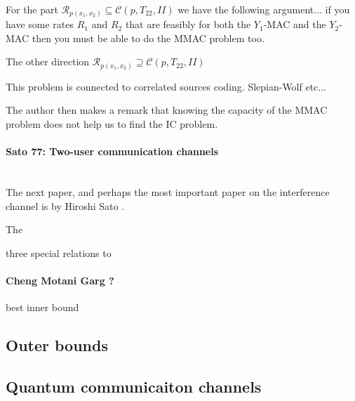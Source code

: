 \documentclass[aps,11pt,twoside,letterpaper]{article}
\begin{document}
         \\
        For the part $\mathcal{R}_{p(x_1,x_2)} \subseteq \mathcal{C}(p,T_{22},II)$ we have the following argument...
        if you have some rates $R_1$ and $R_2$ that are feasibly for both the $Y_1$-MAC and the $Y_2$-MAC then
        you must be able to do the MMAC problem too.
        
        The other direction $\mathcal{R}_{p(x_1,x_2)} \supseteq \mathcal{C}(p,T_{22},II)$  



        This problem is connected to correlated sources coding. Slepian-Wolf etc...


        The author then makes a remark that knowing the capacity of the MMAC problem
        does not help us to find the IC problem.
        




        \paragraph{Sato 77: Two-user communication channels} \\
        The next paper, and perhaps the most important paper on the interference channel is
        by Hiroshi Sato \cite{Sato77}.

        The 
        
        three special relations to 

        \paragraph{Cheng Motani Garg ?}

        best inner bound



    \subsection{Outer bounds}





    \subsection{Quantum communicaiton channels}



\end{document}
